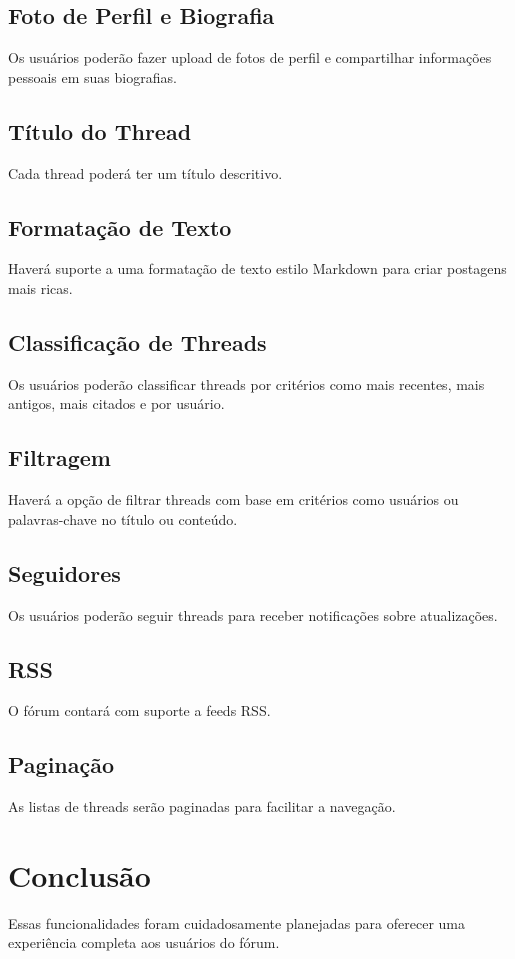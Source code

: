 \documentclass{article}
\begin{document}
  \subsection{Foto de Perfil e Biografia}
  Os usuários poderão fazer upload de fotos de perfil e compartilhar informações pessoais em suas biografias.
  
  \subsection{Título do Thread}
  Cada thread poderá ter um título descritivo.
  
  \subsection{Formatação de Texto}
  Haverá suporte a uma formatação de texto estilo Markdown para criar postagens mais ricas.
  
  \subsection{Classificação de Threads}
  Os usuários poderão classificar threads por critérios como mais recentes, mais antigos, mais citados e por usuário.
  
  \subsection{Filtragem}
  Haverá a opção de filtrar threads com base em critérios como usuários ou palavras-chave no título ou conteúdo.
  
  \subsection{Seguidores}
  Os usuários poderão seguir threads para receber notificações sobre atualizações.
  
  \subsection{RSS}
  O fórum contará com suporte a feeds RSS.
  
  \subsection{Paginação}
  As listas de threads serão paginadas para facilitar a navegação.
  
  \section{Conclusão}
  Essas funcionalidades foram cuidadosamente planejadas para oferecer uma experiência completa aos usuários do fórum.
  
  
\end{document}
